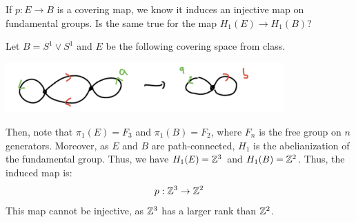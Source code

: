 \documentclass[12pt]{article}
\begin{document}
\begin{problem}{2}
     If $p \colon E \to B$ is a covering map, we know it induces an injective map on fundamental groups. Is the same true for the map $H_1(E) \to H_1(B)$?
\end{problem}
\begin{solution}
    Let $B = S^1 \vee S^1$ and $E$ be the following covering space from class. \bbni
    \begin{centering}
    \includegraphics[width=0.8\textwidth]{assets/hwk7_cover.png}
    \end{centering} \bbni
    Then, note that $\pi_1(E) = F_3$ and $\pi_1(B) = F_2$, where $F_n$ is the free group on $n$ generators. Moreover, as $E$ and $B$ are path-connected, $H_1$ is the abelianization of the fundamental group. Thus, we have $H_1(E) = \mathbb Z^3$ and $H_1(B) = \mathbb Z^2$. Thus, the induced map is: 
    \[  p: \mathbb Z^3 \to \mathbb Z^2\]
    This map cannot be injective, as $\mathbb Z^3$ has a larger rank than $\mathbb Z^2$. 
\end{solution}
\newpage
\end{document}
